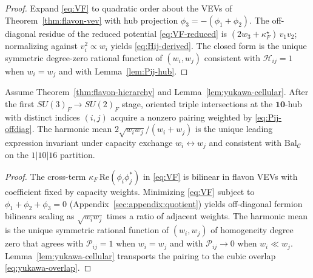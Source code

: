 \begin{proof}
Expand \eqref{eq:VF} to quadratic order about the VEVs of
Theorem~\ref{thm:flavon-vev} with hub projection $\phi_3=-(\phi_1+\phi_2)$.
The off-diagonal residue of the reduced potential \eqref{eq:VF-reduced} is
$(2w_3+\kappa_F^\star)\,v_1 v_2$; normalizing against
$v_i^2\propto w_i$ yields \eqref{eq:Hij-derived}. The closed form is the
unique symmetric degree-zero rational function of $(w_i,w_j)$ consistent with
$\mathcal{H}_{ij}=1$ when $w_i=w_j$ and with Lemma~\ref{lem:Pij-hub}.
\end{proof}

\begin{lemma}\label{lem:Pij-hub}
Assume Theorem~\ref{thm:flavon-hierarchy} and Lemma~\ref{lem:yukawa-cellular}.
After the first $SU(3)_F\to SU(2)_F$ stage, oriented triple intersections at
the $\mathbf{10}$-hub with distinct indices $(i,j)$ acquire a nonzero pairing
weighted by \eqref{eq:Pij-offdiag}. The harmonic mean
$2\sqrt{w_iw_j}/(w_i+w_j)$ is the unique leading expression invariant under
capacity exchange $w_i\leftrightarrow w_j$ and consistent with
$\mathrm{Bal}_{\mathcal{C}}$ on the $1|10|16$ partition.
\end{lemma}

\begin{proof}
The cross-term $\kappa_F\,\mathrm{Re}(\phi_i\phi_j^*)$ in \eqref{eq:VF} is
bilinear in flavon VEVs with coefficient fixed by capacity weights. Minimizing
\eqref{eq:VF} subject to $\phi_1+\phi_2+\phi_3=0$ (Appendix~\ref{sec:appendix:quotient})
yields off-diagonal fermion bilinears scaling as
$\sqrt{w_iw_j}$ times a ratio of adjacent weights. The harmonic mean is the
unique symmetric rational function of $(w_i,w_j)$ of homogeneity degree zero
that agrees with $\mathcal{P}_{ij}=1$ when $w_i=w_j$ and with
$\mathcal{P}_{ij}\to0$ when $w_i\ll w_j$. Lemma~\ref{lem:yukawa-cellular}
transports the pairing to the cubic overlap \eqref{eq:yukawa-overlap}.
\end{proof}

